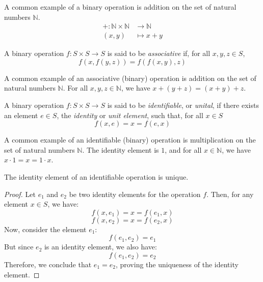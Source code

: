 \documentclass[11pt,fleqn]{book} %
\begin{document}
\begin{example}
    A common example of a binary operation is addition on the set of natural numbers $\mathbb{N}$.
    \begin{equation}
        \begin{split}
            + : \mathbb{N} \times \mathbb{N} & \to \mathbb{N} \\ (x,y) &\mapsto x+y
        \end{split}
    \end{equation}
\end{example}

\begin{definition}
    A binary operation $f: S \times S \to S$ is said to be \emph{associative} if, for all $x,y,z \in S$, 
    \[ f(x,f(y,z)) = f(f(x,y),z) \]
\end{definition}

\begin{example}
    A common example of an associative (binary) operation is addition on the set of natural numbers $\mathbb{N}$. For all $x,y,z \in \mathbb{N}$, we have $x + (y + z) = (x + y) + z$.
\end{example}

\begin{definition}
    A binary operation $f: S \times S \to S$ is said to be \emph{identifiable}, or \emph{unital}, if there exists an element $e \in S$, the \emph{identity} or \emph{unit element}, such that, for all $x \in S$
    \[ f(x,e) = x = f(e,x) \]
\end{definition}

\begin{example}
    A common example of an identifiable (binary) operation is multiplication on the set of natural numbers $\mathbb{N}$. The identity element is $1$, and for all $x \in \mathbb{N}$, we have $x \cdot 1 = x = 1 \cdot x$.
\end{example}

\begin{proposition}
    The identity element of an identifiable operation is unique.
\end{proposition}

\begin{proof}
    Let $e_1$ and $e_2$ be two identity elements for the operation $f$. Then, for any element $x \in S$, we have:
    \[ f(x,e_1) = x = f(e_1,x) \]
    \[ f(x,e_2) = x = f(e_2,x) \]
    Now, consider the element $e_1$:
    \[ f(e_1,e_2) = e_1 \]
    But since $e_2$ is an identity element, we also have:
    \[ f(e_1,e_2) = e_2 \]
    Therefore, we conclude that $e_1 = e_2$, proving the uniqueness of the identity element.
\end{proof}
\end{document}

